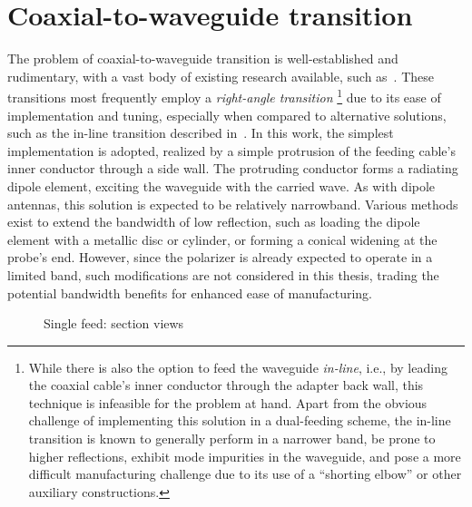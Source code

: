 \documentclass[11pt,a4paper,twoside,openany]{report}
\newlength{\twosubht}
\begin{document}
\section{Coaxial-to-waveguide transition}
\label{section:coaxial-to-waveguide-transition}
The problem of coaxial-to-waveguide transition is well-established and rudimentary, with a vast body of existing research available, such as~\parencite{fabregas-et-al:coaxial-to-rectangular-waveguide-transitions}. These transitions most frequently employ a \emph{right-angle transition}%
    \footnote{While there is also the option to feed the waveguide \emph{in-line}, i.e., by leading the coaxial cable's inner conductor through the adapter back wall, this technique is infeasible for the problem at hand. Apart from the obvious challenge of implementing this solution in a dual-feeding scheme, the in-line transition is known to generally perform in a narrower band, be prone to higher reflections, exhibit mode impurities in the waveguide, and pose a more difficult manufacturing challenge due to its use of a \enquote{shorting elbow} or other auxiliary constructions.}
due to its ease of implementation and tuning, especially when compared to alternative solutions, such as the in-line transition described in~\parencite{durga-et-al:millimiter-wave-inline-coaxial-to-rectangular-waveguide-transition}. In this work, the simplest implementation is adopted, realized by a simple protrusion of the feeding cable's inner conductor through a side wall. The protruding conductor forms a radiating dipole element, exciting the waveguide with the carried wave. As with dipole antennas, this solution is expected to be relatively narrowband. Various methods exist to extend the bandwidth of low reflection, such as loading the dipole element with a metallic disc or cylinder, or forming a conical widening at the probe's end. However, since the polarizer is already expected to operate in a limited band, such modifications are not considered in this thesis, trading the potential bandwidth benefits for enhanced ease of manufacturing.

\begin{figure}[!ht]
    \sbox{}
    \setlength{\twosubht}{\ht\twosubbox}

    \centering
    \quad
    \caption{\label{fig:single-feed-model}Single feed: section views}
\end{figure}
\end{document}
